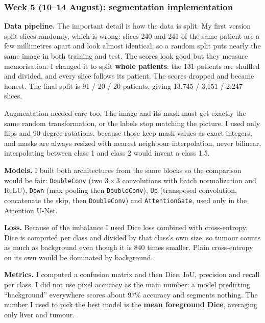 \documentclass[11pt,a4paper]{article}
\begin{document}
\subsubsection*{Week 5 (10--14 August): segmentation implementation}

\textbf{Data pipeline.} The important detail is how the data is split. My first
version split slices randomly, which is wrong: slices 240 and 241 of the same
patient are a few millimetres apart and look almost identical, so a random split
puts nearly the same image in both training and test. The scores look good but
they measure memorisation. I changed it to split \textbf{whole patients}: the 131
patients are shuffled and divided, and every slice follows its patient. The
scores dropped and became honest. The final split is 91 / 20 / 20 patients,
giving 13{,}745 / 3{,}151 / 2{,}247 slices.

Augmentation needed care too. The image and its mask must get exactly the
same random transformation, or the labels stop matching the picture. I used only
flips and 90-degree rotations, because those keep mask values as exact integers,
and masks are always resized with nearest neighbour interpolation, never
bilinear, interpolating between class 1 and class 2 would invent a class 1.5.

\textbf{Models.} I built both architectures from the same blocks so the
comparison would be fair: \texttt{DoubleConv} (two $3\times3$ convolutions with
batch normalization and ReLU), \texttt{Down} (max pooling then
\texttt{DoubleConv}), \texttt{Up} (transposed convolution, concatenate the skip,
then \texttt{DoubleConv}) and \texttt{AttentionGate}, used only in the Attention
U-Net.

\textbf{Loss.} Because of the imbalance I used Dice loss combined with
cross-entropy. Dice is computed per class and divided by that class's own size,
so tumour counts as much as background even though it is 840 times smaller. Plain
cross-entropy on its own would be dominated by background.

\textbf{Metrics.} I computed a confusion matrix and then Dice, IoU, precision and
recall per class. I did not use pixel accuracy as the main number: a
model predicting ``background'' everywhere scores about 97\% accuracy and
segments nothing. The number I used to pick the best model is the \textbf{mean
foreground Dice}, averaging only liver and tumour.


\end{document}
